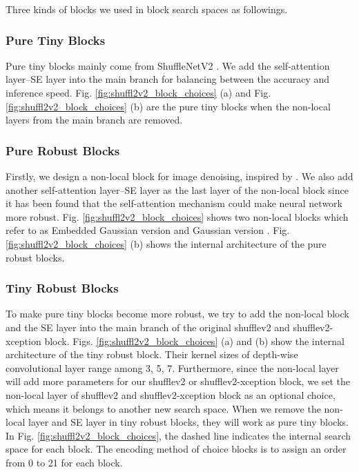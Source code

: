 \documentclass[journal]{IEEEtran}
\newcommand{\revised}[1]{{\color{black} #1}}
\begin{document}
Three kinds of blocks we used in block search spaces as followings.

\subsubsection{\textbf{Pure Tiny Blocks}}
\revised{Pure tiny blocks mainly come from ShuffleNetV2 \cite{ma2018shufflenet}. We add the self-attention layer--SE layer \cite{hu2018squeeze} into the main branch for balancing between the accuracy and inference speed. Fig. \ref{fig:shuffl2v2_block_choices} (a) and Fig. \ref{fig:shuffl2v2_block_choices} (b) are the pure tiny blocks when the non-local layers from the main branch are removed.}

\subsubsection{\textbf{Pure Robust Blocks}}
Firstly, we design a non-local block for image denoising, inspired by \cite{wang2018non}. We also add another self-attention layer--SE layer \cite{hu2018squeeze} as the last layer of the non-local block since it has been found \cite{wang2018non} that the self-attention mechanism could make neural network more robust. Fig. \ref{fig:shuffl2v2_block_choices} shows two non-local blocks which refer to as Embedded Gaussian version and Gaussian version \cite{wang2018non}. Fig. \ref{fig:shuffl2v2_block_choices} (b) shows the internal architecture of the pure robust blocks.

\subsubsection{\textbf{Tiny Robust Blocks}}
To make pure tiny blocks become more robust, we try to add the non-local block and the SE layer into the main branch of the original shufflev2 and shufflev2-xception block. Figs. \ref{fig:shuffl2v2_block_choices} (a) and (b) show the internal architecture of the tiny robust block. Their kernel sizes of depth-wise convolutional layer range among 3, 5, 7. Furthermore, since the non-local layer will add more parameters for our shufflev2 or shufflev2-xception block, we set the non-local layer of shufflev2 and shufflev2-xception block as an optional choice, which means it belongs to another new search space. When we remove the non-local layer and SE layer in tiny robust blocks, they will work as pure tiny blocks. In Fig. \ref{fig:shuffl2v2_block_choices}, the dashed line indicates the internal search space for each block. The encoding method of choice blocks is to assign an order from 0 to 21 for each block.
\end{document}
